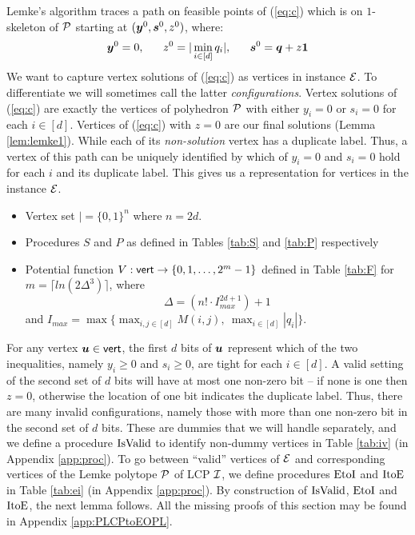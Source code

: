 Lemke's algorithm traces a path on feasible points of (\ref{eq:c}) which is on
$1$-skeleton of $\mbox{${\mathcal P}$}$ starting at $(\mbox{\boldmath $y$}^0,\mbox{\boldmath $s$}^0,z^0)$, where:
\begin{equation}\label{eq:v0}
\yy^0=0,\ \ \ \ \ z^0= |\min_{i \in [d]} q_i|,\ \ \ \ \  \ps^0=\qq+z\ones
\end{equation}
We want to capture
vertex solutions of (\ref{eq:c}) as vertices in \EOPL instance $\mbox{${\mathcal E}$}$. To
differentiate we will sometimes call the latter {\em configurations}. Vertex
solutions of (\ref{eq:c}) are exactly the vertices of polyhedron $\mbox{${\mathcal P}$}$ with
either $y_i=0$ or $s_i=0$ for each $i\in [d]$. Vertices of (\ref{eq:c}) with
$z=0$ are our final solutions (Lemma \ref{lem:lemke1}). While each of its {\em
non-solution} vertex has a duplicate label. Thus, a vertex of this path can be
uniquely identified by which of $y_i=0$ and $s_i=0$ hold for each $i$ and its
duplicate label. This gives us a representation for vertices in the \EOPL
instance $\mbox{${\mathcal E}$}$. 

\medskip


\begin{itemize}
\item Vertex set $\vert=\{0,1\}^n$ where $n = 2d$. 
\item Procedures $S$ and $P$ as defined in Tables \ref{tab:S} and \ref{tab:P} respectively
\item Potential function $\mbox{$V$}:\operatorname{\mathsf{vert}} \rightarrow \{0,1,\dots, 2^m-1\}$ defined in Table \ref{tab:F} for $m=\lceil ln(2\Delta^3)\rceil$, 
	  where $$\Delta=(n! \cdot I_{max}^{2d+1})+1$$ 
	  and $I_{max} = \max\{\max_{i,j\in [d]} M(i,j),\ \max_{i\in [d]} |q_i|\}$. 
\end{itemize}

For any vertex $\mbox{\boldmath $u$}\in \operatorname{\mathsf{vert}}$, the first $d$ bits of $\mbox{\boldmath $u$}$ represent
which of the two inequalities, namely $y_i\ge 0$ and $s_i\ge 0$, are tight for
each $i \in [d]$. A valid setting of the second set of $d$ bits will have 
at most one non-zero bit -- if none is one then $z=0$, otherwise the location of one bit indicates the duplicate label. 
Thus, there are many invalid configurations, namely
those with more than one non-zero bit in the second set of $d$ bits. 
These are dummies that we will handle separately, and we define a procedure 
$\mbox{IsValid}$ to identify non-dummy vertices in Table \ref{tab:iv} (in Appendix \ref{app:proc}). 
To go between ``valid'' vertices of $\mbox{${\mathcal E}$}$ and corresponding vertices of the Lemke polytope
$\mbox{${\mathcal P}$}$ of LCP $\mbox{${\mathcal I}$}$, we define procedures $\mbox{EtoI}$ and $\mbox{ItoE}$ in Table
\ref{tab:ei} (in Appendix \ref{app:proc}).  
By construction of $\mbox{IsValid}$, $\mbox{EtoI}$ and $\mbox{ItoE}$, the next lemma follows.
All the missing proofs of this section may be found in Appendix \ref{app:PLCPtoEOPL}.

